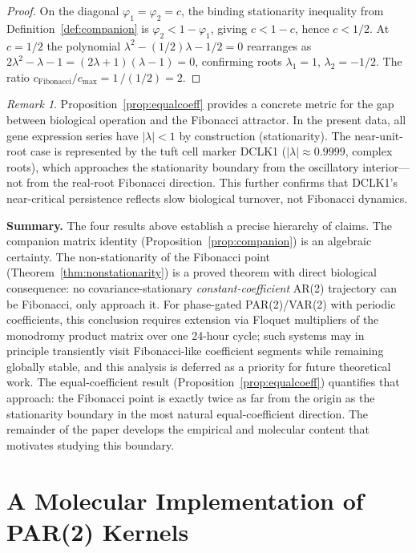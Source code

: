 \documentclass[11pt,letterpaper]{article}
\theoremstyle{definition}
\theoremstyle{remark}
\newtheorem{remark}[theorem]{Remark}
\begin{document}
\begin{proof}
On the diagonal $\varphi_1 = \varphi_2 = c$, the binding stationarity inequality from Definition~\ref{def:companion} is $\varphi_2 < 1 - \varphi_1$, giving $c < 1-c$, hence $c < 1/2$. At $c = 1/2$ the polynomial $\lambda^2 - (1/2)\lambda - 1/2 = 0$ rearranges as $2\lambda^2 - \lambda - 1 = (2\lambda+1)(\lambda-1) = 0$, confirming roots $\lambda_1=1$, $\lambda_2=-1/2$. The ratio $c_{\mathrm{Fibonacci}}/c_{\max} = 1\,/(1/2) = 2$.
\end{proof}

\begin{remark}\label{rem:dclk1}
Proposition~\ref{prop:equalcoeff} provides a concrete metric for the gap between biological operation and the Fibonacci attractor. In the present data, all gene expression series have $|\lambda| < 1$ by construction (stationarity). The near-unit-root case is represented by the tuft cell marker DCLK1 ($|\lambda| \approx 0.9999$, complex roots), which approaches the stationarity boundary from the oscillatory interior---not from the real-root Fibonacci direction. This further confirms that DCLK1's near-critical persistence reflects slow biological turnover, not Fibonacci dynamics.
\end{remark}

\textbf{Summary.} The four results above establish a precise hierarchy of claims. The companion matrix identity (Proposition~\ref{prop:companion}) is an algebraic certainty. The non-stationarity of the Fibonacci point (Theorem~\ref{thm:nonstationarity}) is a proved theorem with direct biological consequence: no covariance-stationary \emph{constant-coefficient} AR(2) trajectory can be Fibonacci, only approach it. For phase-gated PAR(2)/VAR(2) with periodic coefficients, this conclusion requires extension via Floquet multipliers of the monodromy product matrix over one 24-hour cycle; such systems may in principle transiently visit Fibonacci-like coefficient segments while remaining globally stable, and this analysis is deferred as a priority for future theoretical work. The equal-coefficient result (Proposition~\ref{prop:equalcoeff}) quantifies that approach: the Fibonacci point is exactly twice as far from the origin as the stationarity boundary in the most natural equal-coefficient direction. The remainder of the paper develops the empirical and molecular content that motivates studying this boundary.

\section{A Molecular Implementation of PAR(2) Kernels}
\end{document}
